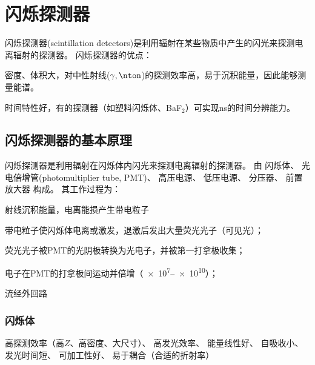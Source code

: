 \chapter{闪烁探测器}

闪烁探测器(scintillation detectors)是利用辐射在某些物质中产生的闪光来探测电离辐射的探测器。
闪烁探测器的优点：
\begin{compactenum}
	\item 密度、体积大，对中性射线($\gamma,\nton$)的探测效率高，易于沉积能量，因此能够测量能谱。
	\item 时间特性好，有的探测器（如塑料闪烁体、BaF$_2$）可实现ns的时间分辨能力。
\end{compactenum}

\section{闪烁探测器的基本原理}

闪烁探测器是利用辐射在闪烁体内闪光来探测电离辐射的探测器。
由
闪烁体、
光电倍增管(photomultiplier tube, PMT)、
高压电源、
低压电源、
分压器、
前置放大器
构成。
其工作过程为：
\begin{compactenum}
	\item 射线沉积能量，电离能损产生带电粒子
	\item 带电粒子使闪烁体电离或激发，退激后发出大量荧光光子（可见光）；
	\item 荧光光子被PMT的光阴极转换为光电子，并被第一打拿极收集；
	\item 电子在PMT的打拿极间运动并倍增（\numrange{e7}{e10}）；
	\item 流经外回路
\end{compactenum}

\subsection{闪烁体}

高探测效率（高$Z$、高密度、大尺寸）、
高发光效率、
能量线性好、
自吸收小、
发光时间短、
可加工性好、
易于耦合（合适的折射率）
